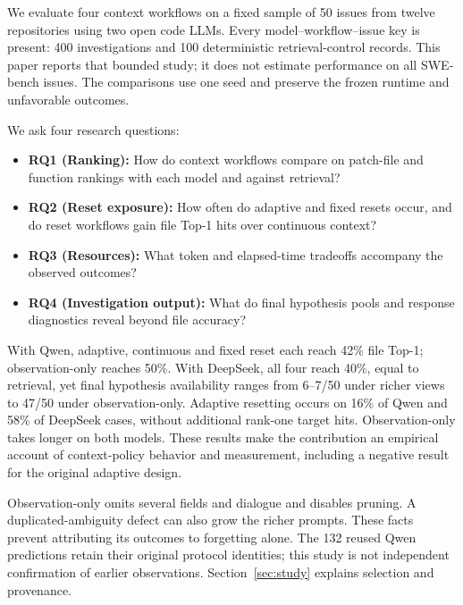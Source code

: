 We evaluate four context workflows on a fixed sample of 50 issues from twelve repositories using two open code LLMs. Every model--workflow--issue key is present: 400 investigations and 100 deterministic retrieval-control records. This paper reports that bounded study; it does not estimate performance on all SWE-bench issues. The comparisons use one seed and preserve the frozen runtime and unfavorable outcomes.

We ask four research questions:
\begin{itemize}
\item \textbf{RQ1 (Ranking):} How do context workflows compare on patch-file and function rankings with each model and against retrieval?
\item \textbf{RQ2 (Reset exposure):} How often do adaptive and fixed resets occur, and do reset workflows gain file Top-1 hits over continuous context?
\item \textbf{RQ3 (Resources):} What token and elapsed-time tradeoffs accompany the observed outcomes?
\item \textbf{RQ4 (Investigation output):} What do final hypothesis pools and response diagnostics reveal beyond file accuracy?
\end{itemize}

With Qwen, adaptive, continuous and fixed reset each reach 42\% file Top-1; observation-only reaches 50\%. With DeepSeek, all four reach 40\%, equal to retrieval, yet final hypothesis availability ranges from 6--7/50 under richer views to 47/50 under observation-only. Adaptive resetting occurs on 16\% of Qwen and 58\% of DeepSeek cases, without additional rank-one target hits. Observation-only takes longer on both models. These results make the contribution an empirical account of context-policy behavior and measurement, including a negative result for the original adaptive design.

Observation-only omits several fields and dialogue and disables pruning. A duplicated-ambiguity defect can also grow the richer prompts. These facts prevent attributing its outcomes to forgetting alone. The 132 reused Qwen predictions retain their original protocol identities; this study is not independent confirmation of earlier observations. Section~\ref{sec:study} explains selection and provenance.


